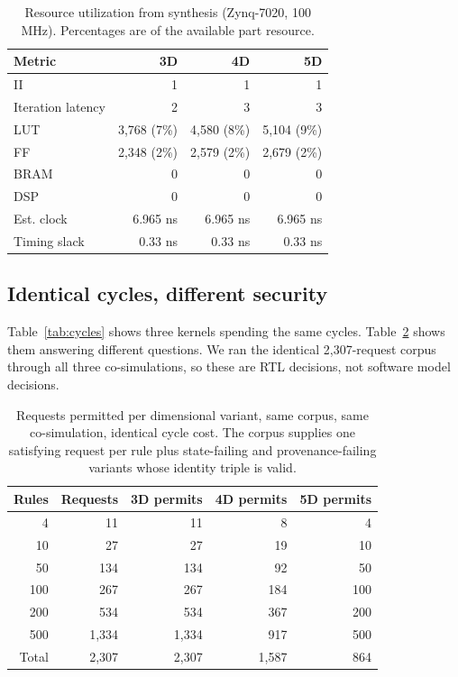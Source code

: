 \documentclass[conference]{IEEEtran}
\newcommand{\new}[1]{\textcolor{hkred}{#1}}
\newcommand{\newcolor}{\color{hkred}}
\begin{document}
\begin{table}[t]
\caption{Resource utilization from synthesis (Zynq-7020, 100 MHz). \new{Percentages are of the available part resource.}}
\label{tab:resources}
\centering
\begin{tabular}{lrrr}
\toprule
Metric & \new{3D} & 4D & 5D \\
\midrule
II & \new{1} & 1 & 1 \\
Iteration latency & \new{2} & 3 & 3 \\
LUT & \new{3{,}768 (7\%)} & 4{,}580 (8\%) & 5{,}104 (9\%) \\
FF & \new{2{,}348 (2\%)} & 2{,}579 (2\%) & 2{,}679 (2\%) \\
BRAM & \new{0} & 0 & 0 \\
DSP & \new{0} & 0 & 0 \\
\new{Est. clock} & \new{6.965 ns} & \new{6.965 ns} & \new{6.965 ns} \\
Timing slack & \new{0.33 ns} & 0.33 ns & 0.33 ns \\
\bottomrule
\end{tabular}
\end{table}

\subsection{\new{Identical cycles, different security}}

\new{Table~\ref{tab:cycles} shows three kernels spending the same cycles. Table~\ref{tab:rtlauth} shows them answering different questions. We ran the identical 2{,}307-request corpus through all three co-simulations, so these are RTL decisions, not software model decisions.}

\begin{table}[t]
\caption{\new{Requests permitted per dimensional variant, same corpus, same co-simulation, identical cycle cost. The corpus supplies one satisfying request per rule plus state-failing and provenance-failing variants whose identity triple is valid.}}
\label{tab:rtlauth}
\centering
\newcolor
\begin{tabular}{rrrrr}
\toprule
Rules & Requests & 3D permits & 4D permits & 5D permits \\
\midrule
4 & 11 & 11 & 8 & 4 \\
10 & 27 & 27 & 19 & 10 \\
50 & 134 & 134 & 92 & 50 \\
100 & 267 & 267 & 184 & 100 \\
200 & 534 & 534 & 367 & 200 \\
500 & 1{,}334 & 1{,}334 & 917 & 500 \\
\midrule
Total & 2{,}307 & 2{,}307 & 1{,}587 & 864 \\
\bottomrule
\end{tabular}
\end{table}
\end{document}
